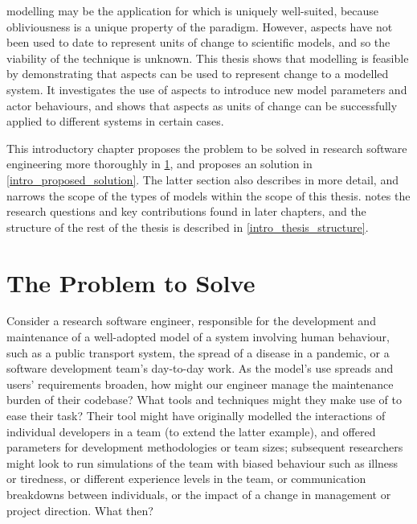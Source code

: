 \Aspectoriented{} modelling may be the application for which \aop{} is uniquely
well-suited, because obliviousness is a unique property of the paradigm.
However, aspects have not been used to date to represent units of change to
scientific models, and so the viability of the technique is unknown. This thesis
shows that \aspectoriented{} modelling is feasible by demonstrating that aspects
can be used to represent change to a modelled system. It investigates the use of
aspects to introduce new model parameters and actor behaviours, and shows that
aspects as units of change can be successfully applied to different systems in
certain cases.

This introductory chapter proposes the problem to be solved in research software
engineering more thoroughly in \cref{intro_problem_to_solve}, and proposes an
\aspectoriented{} solution in \cref{intro_proposed_solution}. The latter section
also describes \aop{} in more detail, and narrows the scope of the types of
models within the scope of this thesis.  notes the
research questions and key contributions found in later chapters, and the
structure of the rest of the thesis is described in
\cref{intro_thesis_structure}.



\section{The Problem to Solve}
\label{intro_problem_to_solve}

Consider a research software engineer, responsible for the development and
maintenance of a well-adopted model of a system involving human behaviour, such as a
public transport system, the spread of a disease in a pandemic, or a software
development team's day-to-day work. As the model's use spreads and users'
requirements broaden, how might our engineer manage the maintenance burden of
their codebase? What tools and techniques might they make use of to ease their
task? Their tool might have originally modelled the interactions of individual
developers in a team (to extend the latter example), and offered parameters for
development methodologies or team sizes; subsequent researchers might look to
run simulations of the team with biased behaviour such as illness or tiredness,
or different experience levels in the team, or communication breakdowns between
individuals, or the impact of a change in management or project direction. What
then?

